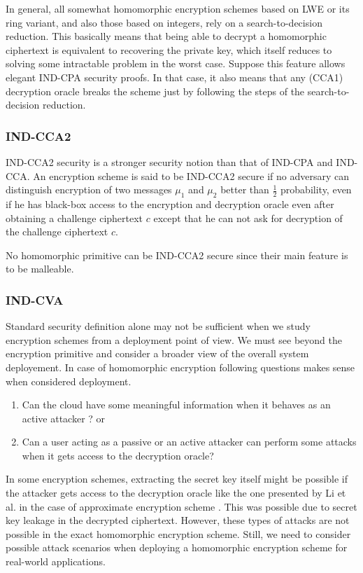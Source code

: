 In general, all somewhat homomorphic encryption schemes based on LWE or its ring variant, and also those based on integers, rely on a search-to-decision reduction. This basically means that being able to decrypt a homomorphic ciphertext is equivalent to recovering the private key, which itself reduces to solving some intractable problem in the worst case. Suppose this feature allows elegant IND-CPA security proofs. In that case, it also means that any (CCA1) decryption oracle breaks the scheme just by following the steps of the search-to-decision reduction.




\subsubsection{IND-CCA2} IND-CCA2 security is a stronger security notion than that of IND-CPA and IND-CCA. An encryption scheme is said to be IND-CCA2  secure if no adversary can distinguish encryption of two messages $\mu_1$ and $\mu_2$ better than $\frac{1}{2}$ probability, even if he has black-box access to the encryption and decryption oracle even after obtaining a challenge ciphertext $c$ except that he can not ask for decryption of the challenge ciphertext $c$.

No homomorphic primitive can be IND-CCA2 secure since their main feature is to be malleable.

\subsubsection{IND-CVA}Standard security definition alone may not be sufficient when we study encryption schemes from a deployment point of view. We must see beyond the encryption primitive and consider a broader view of the overall system deployement. In case of homomorphic encryption following questions makes sense when considered deployment.
\begin{enumerate}
    \item Can the cloud have some meaningful information when it behaves as an active attacker ? or
    \item Can a user acting as a passive or an active attacker can perform some attacks when it gets access to the decryption oracle?
\end{enumerate}



In some encryption schemes, extracting the secret key itself might be possible if the attacker gets access to the decryption oracle like the one presented by Li et al. \cite{li2021security} in the case of approximate encryption scheme \cite{cheon2017homomorphic}. This was possible due to secret key leakage in the decrypted ciphertext. However, these types of attacks are not possible in the exact homomorphic encryption scheme. Still, we need to consider possible attack scenarios when deploying a homomorphic encryption scheme for real-world applications.

